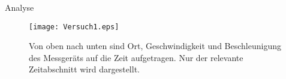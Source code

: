 \documentclass{alex_gp}
\begin{document}
\newpage
\begin{mybox}{Analyse}
	\begin{figure}[H]
		\vspace{-0.5cm}		
		\texttt{[image: Versuch1.eps]}
		\caption{Von oben nach unten sind Ort, Geschwindigkeit und Beschleunigung des Messgeräts auf die Zeit aufgetragen. Nur der relevante Zeitabschnitt wird dargestellt.}
	\end{figure}
\end{mybox}
\end{document}
